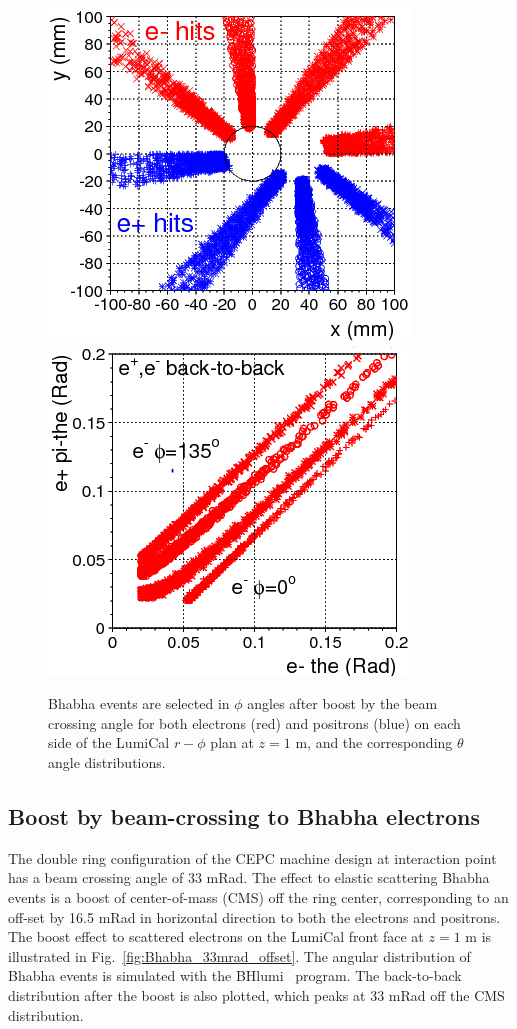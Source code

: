 \begin{figure}[p!]
	\vspace{.5cm}
	\centering
	\includegraphics[width=.35\linewidth]{Figures/MDI/BH_b2b_phi.png}  
	\hspace{.2cm}
	\includegraphics[width=.35\linewidth]{Figures/MDI/BH_b2b_the.png} 
	\caption{ Bhabha events are 
		selected in $\phi$ angles after boost by the beam crossing angle
		for both electrons (red) and positrons (blue) on each side
		of the LumiCal $r-\phi$ plan at $z=1$ m, and the corresponding
		$\theta$ angle distributions.
		\label{fig:Bhabha_33mrad_offset2} }
\end{figure}


\subsection{Boost by beam-crossing to Bhabha electrons }   %
\label{sec:beamcross_boost} %

The double ring configuration  of the CEPC 
machine design at interaction point has a beam crossing angle of 33 mRad.
The effect to elastic scattering Bhabha events is a boost of center-of-mass (CMS)
off the ring center, corresponding to an off-set by 16.5 mRad in horizontal
direction to both the electrons and positrons.
The boost effect to scattered electrons on the LumiCal front face at $z=1$ m
is illustrated in Fig.~\ref{fig:Bhabha_33mrad_offset}. The angular distribution
of Bhabha events is simulated with the BHlumi~\cite{BHlumi} program.
The back-to-back distribution after the boost is also plotted, which peaks
at 33 mRad off the CMS distribution.

